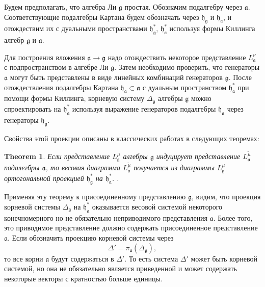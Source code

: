 \documentclass[12pt]{article}
\newtheorem{theorem}{Theorem}
\newcommand{\pia}{\pi_{\mathfrak{a}}}
\newcommand{\gf}{\mathfrak{g}}
\newcommand{\af}{\mathfrak{a}}
\newcommand{\hf}{\mathfrak{h}}
\newcommand{\hfg}{\hf_{\gf}}
\newcommand{\hfa}{\hf_{\af}}
\begin{document}
Будем предполагать, что алгебра Ли $\gf$ простая. Обозначим подалгебру через $\af$. Соответствующие
подалгебры Картана будем обозначать через $\hfg$ и $\hfa$, и отождествим их с дуальными
пространствами $\hfg^{*}$, $\hfa^{*}$ используя формы Киллинга алгебр  $\gf$ и $\af$.

Для построения вложения  $\af\to\gf$ надо отождествить некоторое представление  $L^{\nu}_{\af}$ с
подпространством в алгебре Ли $\gf$. Затем необходимо проверить, что генераторы  $\af$ могут быть
представлены в виде линейных комбинаций генераторов  $\gf$. После отождествления подалгебры Картана
$\hfa\subset \af$ с дуальным пространством $\hfa^{*}$ при помощи формы Киллинга, корневую систему
$\Delta_{\gf}$ алгебры $\gf$ можно спроектировать на  $\hfa^{*}$ используя выражение
генераторов подалгебры $\hfa$ через генераторы  $\hfg$.


Свойства этой проекции описаны в классических работах  \cite{dynkin1952semisimple,dynkin1952maximal} в
следующих теоремах:

\begin{theorem}\label{dyn0}
  Если представление  $L^{\mu}_{\gf}$ алгебры $\gf$ индуцирует представление $L^{\tilde\mu}_{\af}$
  подалегбры $\af$, то весовая диаграмма $L^{\tilde\mu}_{\af}$ получается из диаграммы
  $L^{\mu}_{\gf}$ ортогональной проекцией $\hfg^{*}$ на $\hfa^{*}$.
  \cite{dynkin1952maximal}. 
\end{theorem} 

Применяя эту теорему к присоединенному представлению  $\gf$, видим, что проекция корневой
системы  $\Delta_{\gf}$ на $\hfa^{*}$ оказывается весовой системой некоторого конечномерного но не
обязательно неприводимого представления $\af$. Более того, это приводимое представление должно
содержать присоединенное представление $\af$. Если обозначить проекцию корневой системы через
\begin{equation}
  \label{eq:2}
  \Delta'=\pia\left(\Delta_{\gf}\right),
\end{equation}
то все корни $\af$ будут содержаться в $\Delta'$. То есть система  $\Delta'$ может быть корневой
системой, но она не обязательно является приведенной и может содержать некоторые векторы с
кратностью больше единицы.
\end{document}
